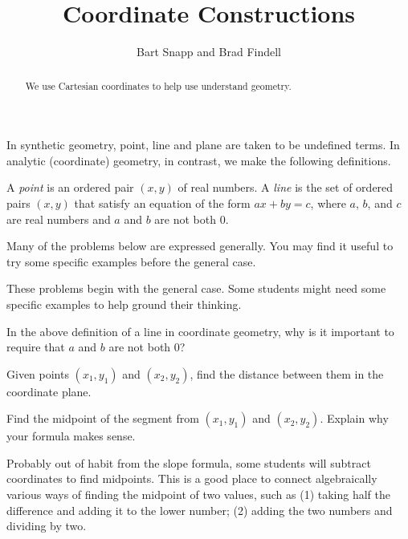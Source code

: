 \documentclass[nooutcomes]{ximera}
\title{Coordinate Constructions}
\author{Bart Snapp and Brad Findell}
\begin{document}
\begin{abstract}
  We use Cartesian coordinates to help use understand geometry.
\end{abstract}
\maketitle

In synthetic geometry, point, line and plane are taken to be undefined terms.  In analytic (coordinate) geometry, in contrast, we make the following definitions.  
\begin{definition}
A \emph{point} is an ordered pair $(x,y)$ of real numbers. A \emph{line} is the set of ordered pairs $(x,y)$ that satisfy an equation of the form $ax + by = c$, where $a$, $b$, and $c$ are real numbers and $a$ and $b$ are not both 0.   
\end{definition}

Many of the problems below are expressed generally.  You may find it useful to try some specific examples before the general case.  

\begin{teachingnote}
These problems begin with the general case.  Some students might need some specific examples to help ground their thinking.
\end{teachingnote}

\begin{problem}
In the above definition of a line in coordinate geometry, why is it important to require that $a$ and $b$ are not both 0?  
\vfill
\end{problem}

\begin{problem}
Given points $(x_1, y_1)$ and $(x_2, y_2)$, find the distance between them in the coordinate plane.
\vfill
\end{problem}

\begin{problem}
Find the midpoint of the segment from $(x_1, y_1)$ and $(x_2, y_2)$.  Explain why your formula makes sense. 
\vfill
\end{problem}

\begin{teachingnote}
Probably out of habit from the slope formula, some students will subtract coordinates to find midpoints.  This is a good place to connect algebraically various ways of finding the midpoint of two values, such as (1) taking half the difference and adding it to the lower number; (2) adding the two numbers and dividing by two. 
\end{teachingnote}   
\end{document}
